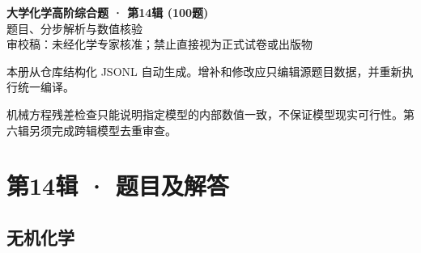 \documentclass[UTF8,11pt,a4paper]{ctexart}
\begin{document}
\begin{center}
{\LARGE\bfseries 大学化学高阶综合题 · 第14辑 (100题)}\\[0.8em]
{\large 题目、分步解析与数值核验}\\[0.5em]
{\small \textcolor{red!65!black}{审校稿：未经化学专家核准；禁止直接视为正式试卷或出版物}}
\end{center}
\vspace{1em}
\noindent 本册从仓库结构化 JSONL 自动生成。增补和修改应只编辑源题目数据，并重新执行统一编译。
\par 机械方程残差检查只能说明指定模型的内部数值一致，不保证模型现实可行性。第六辑另须完成跨辑模型去重审查。
\tableofcontents
\clearpage
\section*{第14辑 · 题目及解答}
\subsection*{无机化学}
\end{document}
